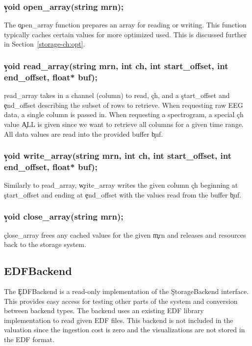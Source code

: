 \subsubsection{\c{void open\_array(string mrn);}}
The \c{open\_array} function prepares an array for reading or writing. This
function typically caches certain values for more optimized used. This is
discussed further in Section~\ref{storage-ch:opt}.

\subsubsection{\c{void read\_array(string mrn, int ch, int start\_offset, int end\_offset, float* buf);}}
\c{read\_array} takes in a channel (column) to read, \c{ch}, and a
\c{start\_offset} and \c{end\_offset} describing the subset of rows to
retrieve.  When requesting raw EEG data, a single column is passed in. When
requesting a spectrogram, a special \c{ch} value \c{ALL} is given since we want
to retrieve all columns for a given time range. All data values are read into
the provided buffer \c{buf}.

\subsubsection{\c{void write\_array(string mrn, int ch, int start\_offset, int end\_offset, float* buf);}}
Similarly to \c{read\_array}, \c{write\_array} writes the given column \c{ch}
beginning at \c{start\_offset} and ending at \c{end\_offset} with the values
read from the buffer \c{buf}.

\subsubsection{\c{void close\_array(string mrn);}}
\c{close\_array} frees any cached values for the given \c{mrn} and releases
and resources back to the storage system.

\subsection{EDFBackend}

The \c{EDFBackend} is a read-only implementation of the \c{StorageBackend}
interface. This provides easy access for testing other parts of the system and
conversion between backend types. The backend uses an existing EDF library
implementation \cite{edflib} to read given EDF files. This backend is not
included in the valuation since the ingestion cost is zero and the
visualizations are not stored in the EDF format.

